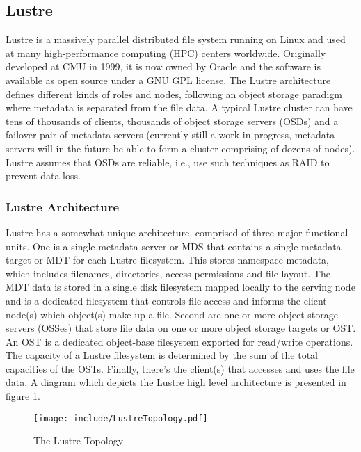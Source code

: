 \documentclass[11pt]{article}
\begin{document}
\subsection{Lustre}
Lustre is a massively parallel distributed file system running on Linux 
and used at many high-performance computing (HPC) centers worldwide. 
Originally developed at CMU in 1999, it is now owned by Oracle and the 
software is available as open source under a GNU GPL license. The Lustre 
architecture defines different kinds of roles and nodes, following an object 
storage paradigm where metadata is separated from the file data. A typical 
Lustre cluster can have tens of thousands of clients, thousands of object 
storage servers (OSDs) and a failover pair of metadata servers (currently 
still a work in progress, metadata servers will in the future be able to 
form a cluster comprising of dozens of nodes). Lustre assumes that OSDs 
are reliable, i.e., use such techniques as RAID to prevent data loss.

\subsubsection{Lustre Architecture}
Lustre has a somewhat unique architecture, comprised of three major 
functional units. One is a single metadata server or MDS that contains 
a single metadata target or MDT for each Lustre filesystem. This stores 
namespace metadata, which includes filenames, directories, access 
permissions and file layout. The MDT data is stored in a single disk 
filesystem mapped locally to the serving node and is a dedicated 
filesystem that controls file access and informs the client node(s) 
which object(s) make up a file. Second are one or more object storage 
servers (OSSes) that store file data on one or more object storage 
targets or OST. An OST is a dedicated object-base filesystem exported 
for read/write operations. The capacity of a Lustre filesystem is 
determined by the sum of the total capacities of the OSTs. Finally, 
there's the client(s) that accesses and uses the file data. A diagram 
which depicts the Lustre high level architecture is presented in
figure \ref{fig:LustreTopology}.

\begin{figure}[htbp]
  \centering
  \texttt{[image: include/LustreTopology.pdf]}
  \caption{The Lustre Topology}
  \label{fig:LustreTopology}
\end{figure}
\end{document}
